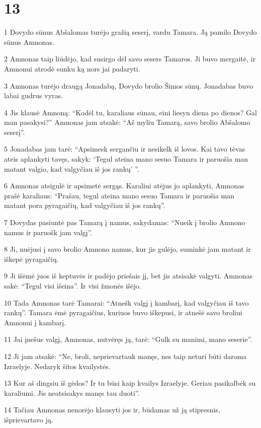\chapter{13}

\par 1 Dovydo sūnus Abšalomas turėjo gražią seserį, vardu Tamara. Ją pamilo Dovydo sūnus Amnonas. 
\par 2 Amnonas taip liūdėjo, kad susirgo dėl savo sesers Tamaros. Ji buvo mergaitė, ir Amnonui atrodė sunku ką nors jai padaryti. 
\par 3 Amnonas turėjo draugą Jonadabą, Dovydo brolio Šimos sūnų. Jonadabas buvo labai gudrus vyras. 
\par 4 Jis klausė Amnoną: “Kodėl tu, karaliaus sūnau, eini liesyn diena po dienos? Gal man pasakysi?” Amnonas jam atsakė: “Aš myliu Tamarą, savo brolio Abšalomo seserį”. 
\par 5 Jonadabas jam tarė: “Apsimesk sergančiu ir nesikelk iš lovos. Kai tavo tėvas ateis aplankyti tavęs, sakyk: ‘Tegul ateina mano sesuo Tamara ir paruošia man matant valgio, kad valgyčiau iš jos rankų’ ”. 
\par 6 Amnonas atsigulė ir apsimetė sergąs. Karaliui atėjus jo aplankyti, Amnonas prašė karaliaus: “Prašau, tegul ateina mano sesuo Tamara ir paruošia man matant pora pyragaičių, kad valgyčiau iš jos rankų”. 
\par 7 Dovydas pasiuntė pas Tamarą į namus, sakydamas: “Nueik į brolio Amnono namus ir paruošk jam valgį”. 
\par 8 Ji, nuėjusi į savo brolio Amnono namus, kur jis gulėjo, suminkė jam matant ir iškepė pyragaičių. 
\par 9 Ji išėmė juos iš keptuvės ir padėjo priešais jį, bet jis atsisakė valgyti. Amnonas sakė: “Tegul visi išeina”. Ir visi žmonės išėjo. 
\par 10 Tada Amnonas tarė Tamarai: “Atnešk valgį į kambarį, kad valgyčiau iš tavo rankų”. Tamara ėmė pyragaičius, kuriuos buvo iškepusi, ir atnešė savo broliui Amnonui į kambarį. 
\par 11 Jai įnešus valgį, Amnonas, nutvėręs ją, tarė: “Gulk su manimi, mano seserie”. 
\par 12 Ji jam atsakė: “Ne, broli, neprievartauk manęs, nes taip neturi būti daroma Izraelyje. Nedaryk šitos kvailystės. 
\par 13 Kur aš dingsiu iš gėdos? Ir tu būsi kaip kvailys Izraelyje. Geriau pasikalbėk su karaliumi. Jis neatsisakys manęs tau duoti”. 
\par 14 Tačiau Amnonas nenorėjo klausyti jos ir, būdamas už ją stipresnis, išprievartavo ją. 
